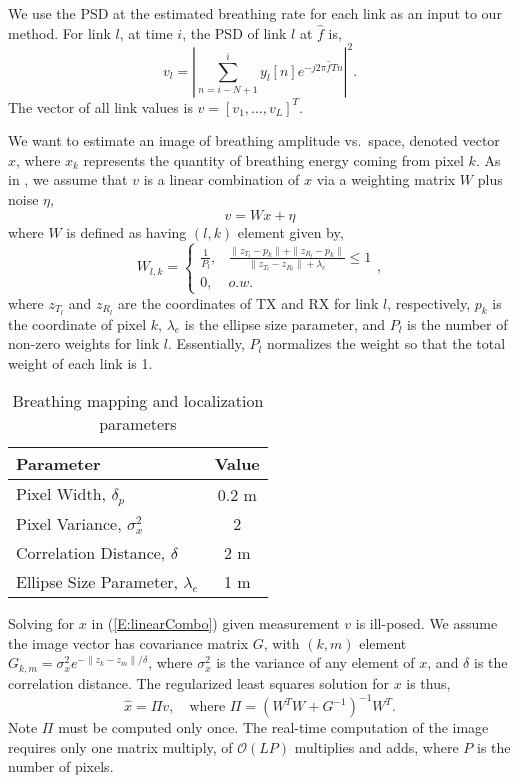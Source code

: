 \documentclass[10pt,journal,letterpaper]{IEEEtran}
\newcommand{\pdfarray}[2]{{ \left\{\begin{array}{ll} {#1}, & {#2} \\ 0, & o.w. \end{array}\right. }}
\newcommand{\Order}[1]{\mathcal{O}\left( {#1} \right)}
\begin{document}
We use the PSD at the estimated breathing rate for each link as an input to our method.  For link $l$, at time $i$, the PSD of link $l$ at $\hat{f}$ is,
\begin{equation}
  v_l = \left| \sum_{n=i-N+1}^{i} y_l[n] e^{-j 2\pi \hat{f} T n}\right|^2.
\end{equation}
The vector of all link values is $v = [v_1, \ldots, v_L]^T$.

We want to estimate an image of breathing amplitude vs.~space, denoted vector $x$, where $x_k$ represents the quantity of breathing energy coming from pixel $k$.  As in \cite{wilson10see}, we assume that $v$ is a linear combination of $x$ via a weighting matrix $W$ plus noise $\eta$,
\begin{equation} \label{E:linearCombo}
   v = Wx + \eta
\end{equation}
where $W$ is defined as having $(l,k)$ element given by,
\begin{equation} \label{E:WeightModel}
   W_{l,k} = \pdfarray{\frac{1}{P_{l}}}{\frac{\| z_{T_l} - p_k \| + \| z_{R_l} - p_k \|}{\| z_{T_l} - z_{R_l} \| + \lambda_e} \le 1},
\end{equation}
where $z_{T_l}$ and $z_{R_l}$ are the coordinates of TX and RX for link $l$, respectively, $p_k$ is the coordinate of pixel $k$, $\lambda_e$ is the ellipse size parameter, and $P_{l}$ is the number of non-zero weights for link $l$.  Essentially, $P_{l}$ normalizes the weight so that the total weight of each link is 1.  

\begin{table}[tbp]
\centering
\begin{tabular}{|lc|}
\hline
\bf Parameter & \bf Value \\
\hline
Pixel Width, $\delta_p$ & 0.2 m \\
Pixel Variance, $\sigma_x^2$ & 2 \\
Correlation Distance, $\delta$ & 2 m \\
Ellipse Size Parameter, $\lambda_e$ & 1 m \\
\hline
\end{tabular}
\caption{Breathing mapping and localization parameters } \label{T:LocParameters}
\end{table}

Solving for $x$ in (\ref{E:linearCombo}) given measurement $v$ is ill-posed.  We assume the image vector has covariance matrix $G$, with $(k,m)$ element $G_{k,m} = \sigma_x^2 e^{-\| z_k - z_m \|/\delta}$, where $\sigma_x^2$ is the variance of any element of $x$, and $\delta$ is the correlation distance.  The regularized least squares solution for $x$ is thus,
\begin{equation} \label{E:inversion}
\hat{x} = \Pi v, \quad \mbox{where } \Pi = \left(W^T W + G^{-1}\right)^{-1} W^T.
\end{equation}
Note $\Pi$ must be computed only once.  The real-time computation of the image requires only one matrix multiply, of $\Order{LP}$ multiplies and adds, where $P$ is the number of pixels.
\end{document}
